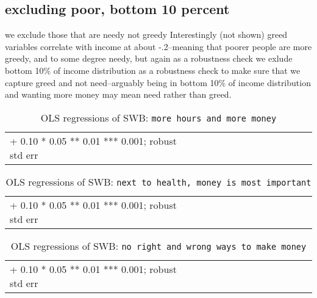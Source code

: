 \documentclass[10pt, letterpaper]{article}
\begin{document}
\begin{spacing}{1.8}
\section{excluding poor, bottom 10 percent}

we exclude those that are needy not greedy
Interestingly (not shown) greed variables correlate with income at about -.2--meaning that
poorer people are more greedy, and to some degree needy, but again as a
robustness check we exlude bottom 10\% of income distribution as a robustness
check to make sure that we capture greed and not need--arguably being in bottom
10\% of income distribution and wanting more money may mean need rather than greed. 


\begin{spacing}{.9} \begin{table}[H]\centering  \label{a} \begin{scriptsize} \begin{tabular}{p{1.8in}p{.5in}p{.5in}p{.5in}p{.5in}p{.5in}p{.5in}p{.5in}p{.5in}p{.5in}p{.5 in}p{.5in}p{.5 in}}\hline  \hline + 0.10 * 0.05 ** 0.01 *** 0.001; robust std err \end{tabular}\end{scriptsize}\caption{OLS regressions of SWB: \texttt{more hours and more money}}\end{table} \end{spacing}

\begin{spacing}{.9} \begin{table}[H]\centering  \label{b} \begin{scriptsize} \begin{tabular}{p{1.8in}p{.5in}p{.5in}p{.5in}p{.5in}p{.5in}p{.5in}p{.5in}p{.5in}p{.5in}p{.5 in}p{.5in}p{.5 in}}\hline  \hline + 0.10 * 0.05 ** 0.01 *** 0.001; robust std err \end{tabular}\end{scriptsize}\caption{OLS regressions of SWB:  \texttt{next to  health, money is most  important}}\end{table} \end{spacing}

\begin{spacing}{.9} \begin{table}[H]\centering  \label{c} \begin{scriptsize} \begin{tabular}{p{1.8in}p{.5in}p{.5in}p{.5in}p{.5in}p{.5in}p{.5in}p{.5in}p{.5in}p{.5in}p{.5 in}p{.5in}p{.5 in}}\hline  \hline + 0.10 * 0.05 ** 0.01 *** 0.001; robust std err \end{tabular}\end{scriptsize}\caption{OLS regressions of SWB:  \texttt{no right  and wrong ways to  make money}}\end{table} \end{spacing}


\end{spacing}
\end{document}
